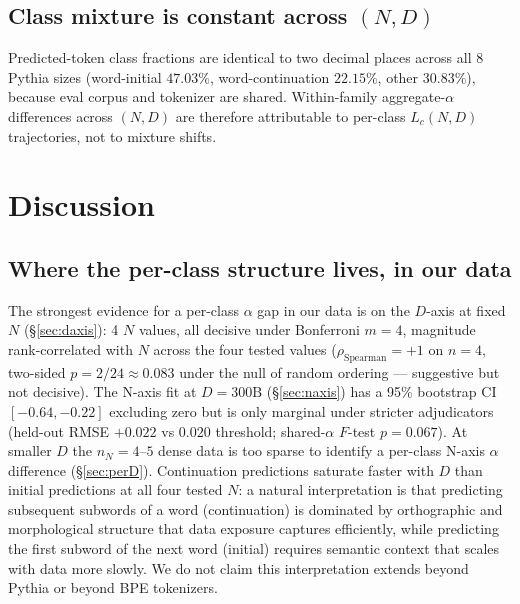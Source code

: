 \documentclass[10pt]{article}
\begin{document}
\subsection{Class mixture is constant across $(N, D)$}
\label{sec:mixture}

Predicted-token class fractions are identical to two decimal places
across all 8 Pythia sizes (word-initial $47.03\%$, word-continuation
$22.15\%$, other $30.83\%$), because eval corpus and tokenizer are
shared. Within-family aggregate-$\alpha$ differences across $(N, D)$
are therefore attributable to per-class $L_c(N, D)$ trajectories, not
to mixture shifts.

\section{Discussion}
\label{sec:disc}

\subsection{Where the per-class structure lives, in our data}

The strongest evidence for a per-class $\alpha$ gap in our data is on
the $D$-axis at fixed $N$ (\S\ref{sec:daxis}): 4 $N$ values, all
decisive under Bonferroni $m{=}4$, magnitude rank-correlated with $N$
across the four tested values ($\rho_\mathrm{Spearman} = +1$ on
$n{=}4$, two-sided $p = 2/24 \approx 0.083$ under the null of
random ordering --- suggestive but not decisive). The N-axis fit at
$D{=}300\text{B}$ (\S\ref{sec:naxis}) has a 95\% bootstrap CI
$[-0.64, -0.22]$ excluding zero but is only marginal under stricter
adjudicators (held-out RMSE $+0.022$ vs $0.020$ threshold;
shared-$\alpha$ $F$-test $p = 0.067$). At smaller $D$ the
$n_N{=}4$--$5$ dense data is too sparse to identify a per-class
N-axis $\alpha$ difference (\S\ref{sec:perD}). Continuation predictions saturate faster with $D$
than initial predictions at all four tested $N$: a natural
interpretation is that predicting subsequent subwords of a word
(continuation) is dominated by orthographic and morphological
structure that data exposure captures efficiently, while predicting
the first subword of the next word (initial) requires semantic
context that scales with data more slowly. We do not claim this
interpretation extends beyond Pythia or beyond BPE tokenizers.
\end{document}
